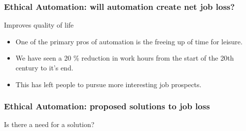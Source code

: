 \begin{frame}
  \frametitle{Ethical Automation: will automation create net job loss? }
  {\Large Improves quality of life}
  \begin{itemize}
    \item One of the primary pros of automation is the freeing up of time for leisure.
    \item  We have seen a 20 \% reduction in work hours from the start of the 20th century to it's end.
    \item This has left people to pursue more interesting job prospects.
  \end{itemize}
\end{frame}
\begin{frame}
  \frametitle{Ethical Automation: proposed solutions to job loss}
  {\Large Is there a need for a solution?}
\end{frame}

